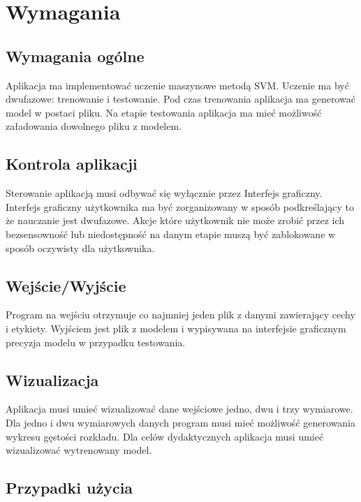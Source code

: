 \documentclass[paper=a4, fontsize=11pt]{scrartcl} %
\numberwithin{equation}{section} %
\numberwithin{figure}{section} %
\begin{document}


\newpage
\section{Wymagania} %
\subsection{Wymagania ogólne}
    \par Aplikacja ma implementować uczenie maszynowe metodą SVM. Uczenie ma być dwufazowe:
    trenowanie i testowanie. Pod czas trenowania aplikacja ma generować model w postaci pliku.
    Na etapie testowania aplikacja ma mieć możliwość załadowania dowolnego pliku z modelem.

\subsection{Kontrola aplikacji}
    \par Sterowanie aplikacją musi odbywać się wyłącznie przez Interfejs graficzny. Interfejs
    graficzny użytkownika ma być zorganizowany w sposób podkreślający to że nauczanie jest
    dwufazowe. Akcje które użytkownik nie może zrobić przez ich bezsensowność lub
    niedostępność na danym etapie muszą być zablokowane w sposób oczywisty dla użytkownika.

\subsection{Wejście/Wyjście}
    \par Program na wejściu otrzymuje co najmniej jeden plik z danymi zawierający cechy i
    etykiety. Wyjściem jest plik z modelem i wypisywana na interfejsie graficznym precyzja
    modelu w przypadku testowania. 

\subsection{Wizualizacja}
    \par Aplikacja musi umieć wizualizować dane wejściowe jedno, dwu i trzy wymiarowe. Dla
    jedno i dwu wymiarowych danych program musi mieć możliwość generowania wykresu gęstości
    rozkładu. Dla celów dydaktycznych aplikacja musi umieć wizualizować wytrenowany model.

\subsection{Przypadki użycia}
\end{document}
